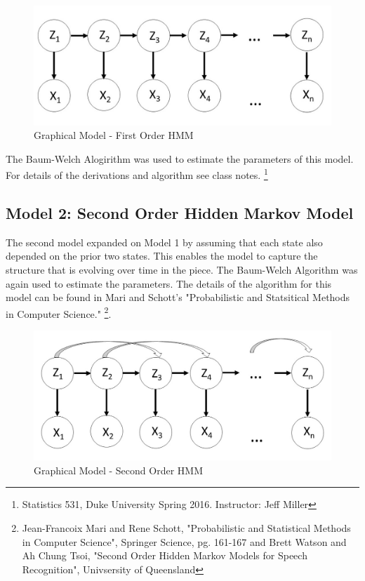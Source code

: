 \documentclass{article} %
\begin{document}
\begin{figure}[H]
\centering
\caption{Graphical Model - First Order HMM}
\includegraphics [scale = 0.35] {Model1.jpg}
\end{figure}

The Baum-Welch Alogirithm was used to estimate the parameters of this model. For details of the derivations and algorithm see class notes. \footnote{Statistics 531, Duke University Spring 2016. Instructor: Jeff Miller}
 
\subsection{Model 2: Second Order Hidden Markov Model}

The second model expanded on Model 1 by assuming that each state also depended on the prior two states. This enables the model to capture the structure that is evolving over time in the piece. The Baum-Welch Algorithm was again used to estimate the parameters. The details of the algorithm for this model can be found in Mari and Schott's "Probabilistic and Statsitical Methods in Computer Science." \footnote{Jean-Francoix Mari and Rene Schott, "Probabilistic and Statistical Methods in Computer Science", Springer Science, pg. 161-167 and Brett Watson and Ah Chung Tsoi, "Second Order Hidden Markov Models for Speech Recognition", Univsersity of Queensland}.

\begin{figure}[H]
\centering
\caption{Graphical Model - Second Order HMM}
\includegraphics [scale = 0.35] {Model2.jpg}
\end{figure}
\end{document}
